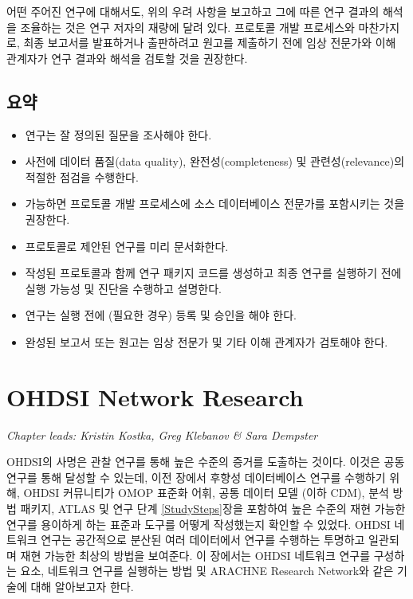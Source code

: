 \documentclass[11pt]{book}
\providecommand{\tightlist}{%
  \setlength{\itemsep}{0pt}\setlength{\parskip}{0pt}}
\theoremstyle{definition}
\theoremstyle{definition}
\theoremstyle{definition}
\theoremstyle{remark}
\let\BeginKnitrBlock\begin \let\EndKnitrBlock\end
\begin{document}
어떤 주어진 연구에 대해서도, 위의 우려 사항을 보고하고 그에 따른 연구
결과의 해석을 조율하는 것은 연구 저자의 재량에 달려 있다. 프로토콜 개발
프로세스와 마찬가지로, 최종 보고서를 발표하거나 출판하려고 원고를
제출하기 전에 임상 전문가와 이해 관계자가 연구 결과와 해석을 검토할 것을
권장한다.

\section{요약}\label{-16}

\BeginKnitrBlock{rmdsummary}
\begin{itemize}
\tightlist
\item
  연구는 잘 정의된 질문을 조사해야 한다.
\item
  사전에 데이터 품질(data quality), 완전성(completeness) 및
  관련성(relevance)의 적절한 점검을 수행한다.
\item
  가능하면 프로토콜 개발 프로세스에 소스 데이터베이스 전문가를
  포함시키는 것을 권장한다.
\item
  프로토콜로 제안된 연구를 미리 문서화한다.
\item
  작성된 프로토콜과 함께 연구 패키지 코드를 생성하고 최종 연구를
  실행하기 전에 실행 가능성 및 진단을 수행하고 설명한다.
\item
  연구는 실행 전에 (필요한 경우) 등록 및 승인을 해야 한다.
\item
  완성된 보고서 또는 원고는 임상 전문가 및 기타 이해 관계자가 검토해야
  한다.
\end{itemize}
\EndKnitrBlock{rmdsummary}

\chapter{OHDSI Network Research}\label{NetworkResearch}

\emph{Chapter leads: Kristin Kostka, Greg Klebanov \& Sara Dempster}

OHDSI의 사명은 관찰 연구를 통해 높은 수준의 증거를 도출하는 것이다.
이것은 공동 연구를 통해 달성할 수 있는데, 이전 장에서 후향성
데이터베이스 연구를 수행하기 위해, OHDSI 커뮤니티가 OMOP 표준화 어휘,
공통 데이터 모델 (이하 CDM), 분석 방법 패키지, ATLAS 및 연구 단계
\ref{StudySteps}장을 포함하여 높은 수준의 재현 가능한 연구를 용이하게
하는 표준과 도구를 어떻게 작성했는지 확인할 수 있었다. OHDSI 네트워크
연구는 공간적으로 분산된 여러 데이터에서 연구를 수행하는 투명하고
일관되며 재현 가능한 최상의 방법을 보여준다. 이 장에서는 OHDSI 네트워크
연구를 구성하는 요소, 네트워크 연구를 실행하는 방법 및 ARACHNE Research
Network와 같은 기술에 대해 알아보고자 한다.
\end{document}

